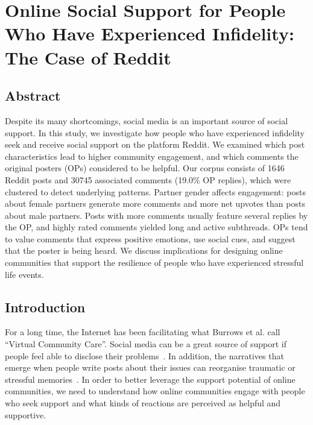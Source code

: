 \chapter{Online Social Support for People Who Have Experienced Infidelity: The Case of Reddit}
\section{Abstract}
Despite its many shortcomings, social media is an important source of social support. In this study, we investigate how people who have experienced infidelity seek and receive social support on the platform Reddit. We examined which post characteristics lead to higher community engagement, and which comments the original posters (OPs) considered to be helpful. Our corpus consists of 1646 Reddit posts and 30745 associated comments (19.0\% OP replies), which were clustered to detect underlying patterns. Partner gender affects engagement: posts about female partners generate more comments and more net upvotes than posts about male partners. Posts with more comments usually feature several replies by the OP, and highly rated comments yielded long and active subthreads. OPs tend to value comments that express positive emotions, use social cues, and suggest that the poster is being heard.
We discuss implications for designing online communities that support the resilience of people who have experienced stressful life events.

\section{Introduction}

For a long time, the Internet has been facilitating what Burrows et al.\cite{burrows2000} call ``Virtual Community Care''. Social media can be a great source of support if people feel able to disclose their problems~\cite{de2014mental,andalibi_sensitive_2017}. In addition, the narratives that emerge when people write posts about their issues can reorganise traumatic or stressful memories~\citep{bevan_how_2015,lepore2002mending,smyth2001effects}. In order to better leverage the support potential of online communities, we need to understand how online communities engage with people who seek support and what kinds of reactions are perceived as helpful and supportive. 

